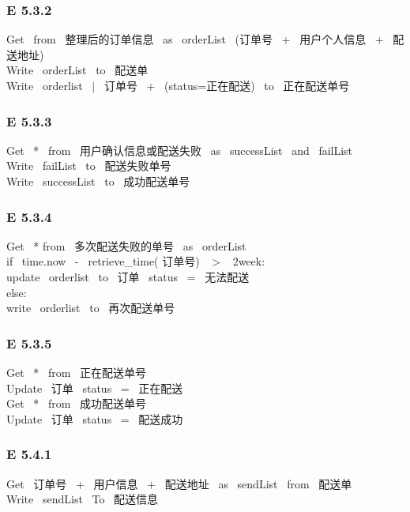 \documentclass{article}
\begin{document}
\begin{CJK*}{UTF8}{gbsn}
\subsubsection*{E 5.3.2}
Get \ from \ 整理后的订单信息 \ as \ orderList \ (订单号 \ + \ 用户个人信息 \ + \ 配送地址) \\ 
Write \ orderList \ to \ 配送单\\ 
Write \ orderlist \ $|$ \ 订单号 \ + \ (status=正在配送) \ to \ 正在配送单号\\ 
\vspace{-1mm}
\subsubsection*{E 5.3.3}
Get \ * \ from \ 用户确认信息或配送失败 \ as \ successList \ and \ failList \\ 
Write \ failList \ to \ 配送失败单号\\ 
Write \ successList \ to \ 成功配送单号\\ 
\vspace{-1mm}
\subsubsection*{E 5.3.4}
Get \ * from \ 多次配送失败的单号 \ as \ orderList \\ 
if \ time.now \ - \ retrieve\_time( 订单号) \ $>$ \ 2week:\\ 
update \ orderlist \ to \ 订单 \ status \ = \ 无法配送 \\ 
else:\\ 
write \ orderlist \ to \ 再次配送单号\\ 
\vspace{-1mm}
\subsubsection*{E 5.3.5}
Get \ * \ from \ 正在配送单号 \\ 
Update \ 订单 \ status \ = \ 正在配送 \\ 
Get \ * \ from \ 成功配送单号 \\ 
Update \ 订单 \ status \ = \ 配送成功\\ 
\vspace{-1mm}
\subsubsection*{E 5.4.1}
Get \ 订单号 \ + \ 用户信息 \ + \ 配送地址 \ as \ sendList \ from \ 配送单 \\ 
Write \ sendList \ To \ 配送信息\\ 
\vspace{-1mm}

\end{CJK*}
\end{document}

